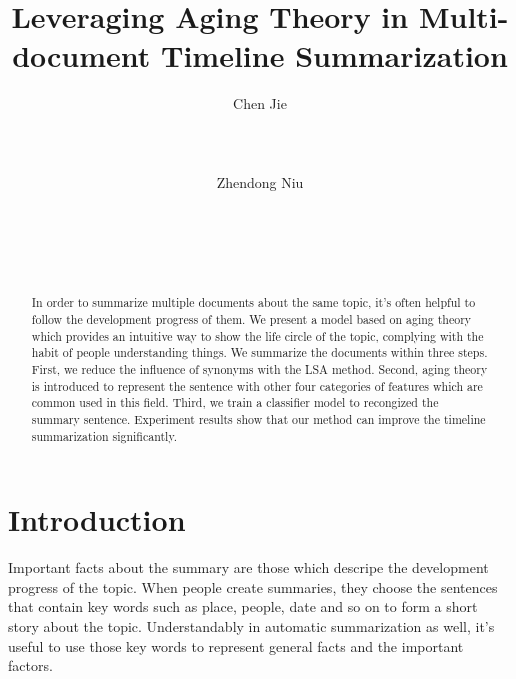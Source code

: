 \documentclass{acm_proc_article-sp}
\begin{document}
%
\title {Leveraging  Aging Theory in Multi-document Timeline Summarization} 



\author{
\alignauthor
Chen Jie\\
     \\
       \\
       \\
\alignauthor
Zhendong Niu\\
         \\
       \\
       \\
       \\
}


\maketitle
\begin{abstract}

In order to summarize multiple documents about the same topic, it's often helpful to follow the development progress of them.
We present a model based on aging theory which provides an intuitive way to show the life circle of the topic, complying with the habit of people understanding things.
We summarize the documents within three steps.
First, we reduce the influence of synonyms with the LSA method.
Second, aging theory is introduced to represent the sentence with other four categories of features which are common used in this field. 
Third, we train a classifier model to recongized the summary sentence. 
Experiment results show that our method can improve the timeline summarization significantly.

\end{abstract}

%
\section{Introduction}
%

Important facts about the summary are those which descripe the development progress of the topic.
When people create summaries, they choose the sentences that contain key words such as place, people, date and so on to form a short story about the topic.
Understandably in automatic summarization as well, it's useful to use those key words to represent general facts and the important factors.
\end{document}
